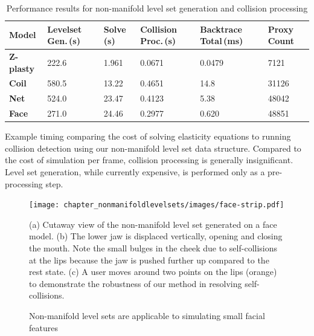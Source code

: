 \begin{table}[h!]
\begin{center}
\setlength\fboxsep{0pt}
\setlength\fboxrule{0.25pt}
\sffamily
\begin{tabular}{
 >{}l
 >{}m{2cm}
 >{}l 
 >{}m{2cm} 
 >{}m{2cm} 
 >{}m{1cm} }
\toprule
\textbf{Model}& \textbf{Level\;set Gen.\,(s)} & \textbf{Solve\,(s)} & \textbf{Collision Proc.\,(s)} & \textbf{Backtrace Total\,(ms)} & \textbf{Proxy Count}\\
\midrule
\textbf{Z-plasty}& 222.6 &  1.961 & 0.0671 & 0.0479 & 7121\\
\midrule
\textbf{Coil}& 580.5 & 13.22 & 0.4651 & 14.8 & 31126\\
\midrule
\textbf{Net}& 524.0 & 23.47 & 0.4123 & 5.38 & 48042\\
\midrule
\textbf{Face}& 271.0 & 24.46 & 0.2977 & 0.620 & 48851\\
\bottomrule
\end{tabular}
\end{center}

\caption{Performance results for non-manifold level set generation and
  collision processing}{Example timing comparing the cost of solving
  elasticity equations to running collision detection using our
  non-manifold level set data structure. Compared to the cost of
  simulation per frame, collision processing is generally
  insignificant. Level set generation, while currently expensive,
  is performed only as a pre-processing step.}
\label{tab:compute-times}
\end{table}


\begin{figure}
  \centering
\texttt{[image: chapter\_nonmanifoldlevelsets/images/face-strip.pdf]}

\caption{Non-manifold level sets are applicable to simulating small
  facial features}{(a) Cutaway view of the non-manifold level set
  generated on a face model. (b) The lower jaw is displaced
  vertically, opening and closing the mouth. Note the small bulges in
  the cheek due to self-collisions at the lips because the jaw is
  pushed further up compared to the rest state.  (c) A user moves
  around two points on the lips (orange) to demonstrate the robustness
  of our method in resolving self-collisions. }
\label{fig:face}

\end{figure}

